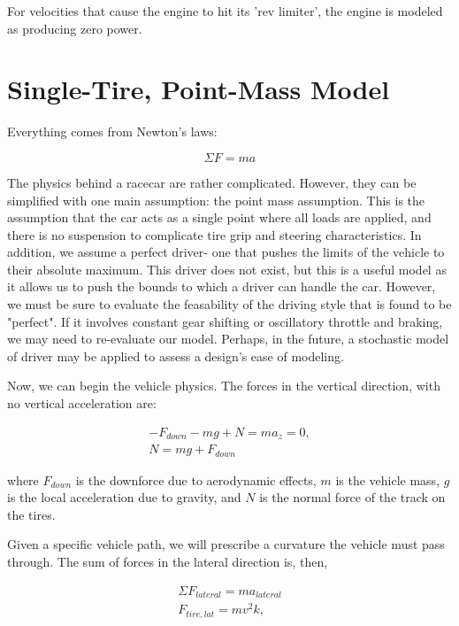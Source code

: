 \documentclass{article}
\begin{document}
For velocities that cause the engine to hit its 'rev limiter', the engine is modeled as producing zero power.

\section{Single-Tire, Point-Mass Model}
Everything comes from Newton's laws:

\begin{equation}
    \label{newtons}
    \Sigma F = m a
\end{equation}

The physics behind a racecar are rather complicated. However, they can be simplified with one main assumption: the point mass assumption. This is the assumption that the car acts as a single point where all loads are applied, and there is no suspension to complicate tire grip and steering characteristics. In addition, we assume a perfect driver- one that pushes the limits of the vehicle to their absolute maximum. This driver does not exist, but this is a useful model as it allows us to push the bounds to which a driver can handle the car. However, we must be sure to evaluate the feasability of the driving style that is found to be "perfect". If it involves constant gear shifting or oscillatory throttle and braking, we may need to re-evaluate our model. Perhaps, in the future, a stochastic model of driver may be applied to assess a design's ease of modeling.

Now, we can begin the vehicle physics. The forces in the vertical direction, with no vertical acceleration are:

\begin{align}
    -F_{down} -m g + N = m a_{z} = 0, \\
    N = m g + F_{down} \label{eq_z}
\end{align}

where $F_{down}$ is the downforce due to aerodynamic effects, $m$ is the vehicle mass, $g$ is the local acceleration due to gravity, and $N$ is the normal force of the track on the tires.

Given a specific vehicle path, we will prescribe a curvature the vehicle must pass through. The sum of forces in the lateral direction is, then,

\begin{align}
    \Sigma F_{lateral} = m a_{lateral} \\
    F_{tire,lat} = m v^2 k, \label{eq_lateral}
\end{align}
\end{document}
